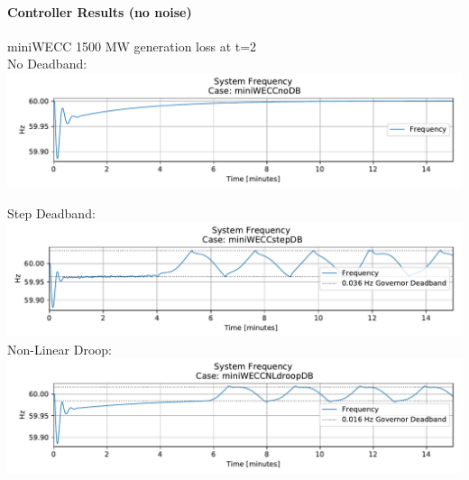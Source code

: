 \documentclass[12pt]{article}
\begin{document}
\paragraph{Controller Results (no noise)} miniWECC 1500 MW generation loss at t=2\ \\
No Deadband:\\
\includegraphics[width=\linewidth]{noDB}
{Step Deadband:\\
\includegraphics[width=\linewidth]{stepDB}
Non-Linear Droop:\\
\includegraphics[width=\linewidth]{NLdroopDB}
}
\end{document}
